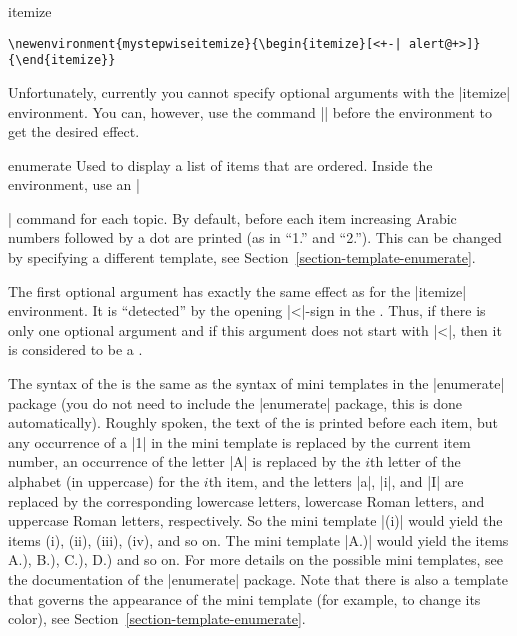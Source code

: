 \begin{environment}{{itemize}}
  \example
\begin{verbatim}
\newenvironment{mystepwiseitemize}{\begin{itemize}[<+-| alert@+>]}{\end{itemize}}
\end{verbatim}

  \lyxnote
  Unfortunately, currently you cannot specify optional arguments with
  the |itemize| environment. You can, however, use the command
  |\beamerdefaultoverlayspecification| before the environment to get
  the desired effect. 
\end{environment}


\begin{environment}{{enumerate}} 
  Used to display a list of items that are ordered.  Inside the
  environment, use an |\item| command for each topic. By default,
  before each item increasing Arabic numbers  followed by a dot are
  printed (as in ``1.'' and ``2.''). This can be changed by specifying
  a different template,  see
  Section~\ref{section-template-enumerate}.

  The first optional argument  has
  exactly the same effect as for the |itemize| environment. It is
  ``detected'' by the opening |<|-sign in the . Thus, if there is only one optional argument and
  if this argument does not start with |<|, then it is considered to
  be a . 

  The syntax of the  is the same as
  the syntax of mini templates in the |enumerate| package (you do not
  need to include the 
  |enumerate| package, this is done automatically). Roughly spoken,
  the text of the  is printed before each item,
  but any occurrence of a |1| in the mini template is replaced by the
  current item number, an occurrence of the letter |A| is replaced by
  the $i$th letter of the alphabet (in uppercase) for the $i$th item,
  and the letters |a|, |i|, and |I| are replaced by the corresponding
  lowercase letters, lowercase Roman letters, and uppercase Roman
  letters, respectively. So the mini template |(i)| would yield the
  items (i), (ii), (iii), (iv), and so on. The mini template |A.)|
  would yield the items A.), B.), C.), D.) and so on. For more details
  on the possible mini templates, see the documentation of the
  |enumerate| package. Note that there is also a template that governs
  the appearance of the mini template (for example, to change its
  color), see Section~\ref{section-template-enumerate}.
  

\end{environment}
